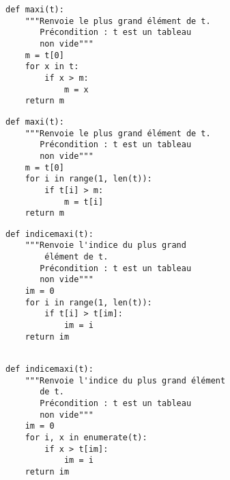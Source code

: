 \exer{}
\setcounter{numques}{0}

\begin{lstlisting}
def maxi(t):
    """Renvoie le plus grand élément de t.
       Précondition : t est un tableau 
       non vide"""
    m = t[0]
    for x in t:
        if x > m:
            m = x 
    return m
\end{lstlisting}


\begin{lstlisting}
def maxi(t):
    """Renvoie le plus grand élément de t.
       Précondition : t est un tableau 
       non vide"""
    m = t[0] 
    for i in range(1, len(t)):
        if t[i] > m:
            m = t[i] 
    return m
\end{lstlisting}


\begin{lstlisting}
def indicemaxi(t):
    """Renvoie l'indice du plus grand 
        élément de t.
       Précondition : t est un tableau 
       non vide"""
    im = 0 
    for i in range(1, len(t)):
        if t[i] > t[im]:
            im = i 
    return im
    
\end{lstlisting}



\begin{lstlisting}
def indicemaxi(t):
    """Renvoie l'indice du plus grand élément 
       de t.
       Précondition : t est un tableau 
       non vide"""
    im = 0 
    for i, x in enumerate(t):
        if x > t[im]:
            im = i 
    return im
\end{lstlisting}